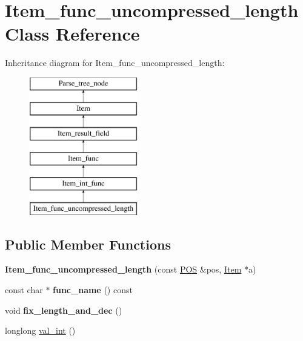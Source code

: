 \hypertarget{classItem__func__uncompressed__length}{}\section{Item\+\_\+func\+\_\+uncompressed\+\_\+length Class Reference}
\label{classItem__func__uncompressed__length}
Inheritance diagram for Item\+\_\+func\+\_\+uncompressed\+\_\+length\+:\begin{figure}[H]
\begin{center}
\leavevmode
\includegraphics[height=6.000000cm]{classItem__func__uncompressed__length}
\end{center}
\end{figure}
\subsection*{Public Member Functions}
\begin{DoxyCompactItemize}
\item 
\mbox{\label{classItem__func__uncompressed__length_aaefa1126fd5cff2b8506dc18ebb2a2a2}} 
{\bfseries Item\+\_\+func\+\_\+uncompressed\+\_\+length} (const \mbox{\hyperlink{structYYLTYPE}{P\+OS}} \&pos, \mbox{\hyperlink{classItem}{Item}} $\ast$a)
\item 
\mbox{\label{classItem__func__uncompressed__length_a9266a09efc49021441916ad3fad89680}} 
const char $\ast$ {\bfseries func\+\_\+name} () const
\item 
\mbox{\label{classItem__func__uncompressed__length_a15049cb42b1b295c407e20dfd13b0503}} 
void {\bfseries fix\+\_\+length\+\_\+and\+\_\+dec} ()
\item 
longlong \mbox{\hyperlink{classItem__func__uncompressed__length_aa0c950556a4e054e59f46eb86694f347}{val\+\_\+int}} ()
\end{DoxyCompactItemize}
